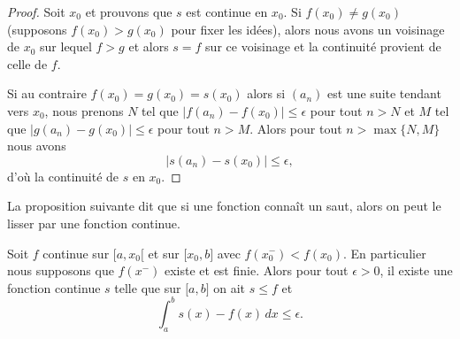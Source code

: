 \begin{proof}
	Soit \( x_0\) et prouvons que \( s\) est continue en \( x_0\). Si \( f(x_0)\neq g(x_0)\) (supposons \( f(x_0)>g(x_0)\) pour fixer les idées), alors nous avons un voisinage de \( x_0\) sur lequel \( f>g\) et alors \( s=f\) sur ce voisinage et la continuité provient de celle de \( f\).

	Si au contraire \( f(x_0)=g(x_0)=s(x_0)\) alors si \( (a_n)\) est une suite tendant vers \( x_0\), nous prenons \( N\) tel que \( \big| f(a_n)-f(x_0) \big|\leq \epsilon\) pour tout \( n>N\) et \( M\) tel que \( \big| g(a_n)-g(x_0) \big|\leq \epsilon\) pour tout \( n> M\). Alors pour tout \( n>\max\{ N,M \}\) nous avons
	\begin{equation}
		\big| s(a_n)-s(x_0) \big|\leq \epsilon,
	\end{equation}
	d'où la continuité de \( s\) en \( x_0\).
\end{proof}

La proposition suivante dit que si une fonction connaît un saut, alors on peut le lisser par une fonction continue.
\begin{proposition} \label{PropTIeYVw}
	Soit \( f\) continue sur \( \mathopen[ a , x_0 [\) et sur \( \mathopen[ x_0 , b \mathclose]\) avec \( f(x_0^-)<f(x_0)\). En particulier nous supposons que \( f(x^-)\) existe et est finie. Alors pour tout \( \epsilon>0\), il existe une fonction continue \( s\) telle que sur \( \mathopen[ a , b \mathclose]\) on ait \( s\leq f\) et
	\begin{equation}
		\int_a^bs(x)-f(x)\,dx\leq \epsilon.
	\end{equation}
\end{proposition}

